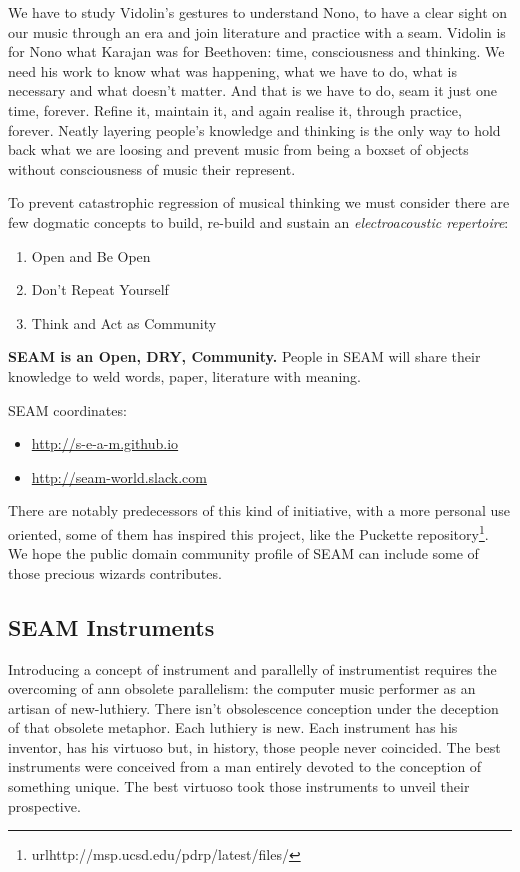 \documentclass[twoside,a4paper]{article}
\begin{document}
We have to study Vidolin's gestures to understand Nono, to have a clear sight on our music through an era and join literature and practice with a seam. Vidolin is for Nono what Karajan was for Beethoven: time, consciousness and thinking. We need his work to know what was happening, what we have to do, what is necessary and what doesn't matter. And that is we have to do, seam it just one time, forever. Refine it, maintain it, and again realise it, through practice, forever. Neatly layering people's knowledge and thinking is the only way to hold back what we are loosing and prevent music from being a boxset of objects without consciousness of music their represent. 

To prevent catastrophic regression of musical thinking we must consider there are few dogmatic concepts to build, re-build and sustain an \emph{electroacoustic repertoire}:
\begin{enumerate}
  \item Open and Be Open
  \item Don't Repeat Yourself
  \item Think and Act as Community
\end{enumerate}

\textbf{SEAM is an Open, DRY, Community.} People in SEAM will share their knowledge to weld words, paper, literature with meaning.

SEAM coordinates: 
\begin{itemize}
\item \url{http://s-e-a-m.github.io}
\item \url{http://seam-world.slack.com}
\end{itemize}

There are notably predecessors of this kind of initiative, with a more personal use oriented, some of them has inspired this project, like the Puckette\cite{mp01} repository\footnote{url{http://msp.ucsd.edu/pdrp/latest/files/}}. We hope the public domain community profile of SEAM can include some of those precious wizards contributes. 


\subsection{SEAM Instruments}

Introducing a concept of instrument and parallelly of instrumentist requires the overcoming of ann obsolete parallelism: the computer music performer as an artisan of new-luthiery. There isn't obsolescence conception under the deception of that obsolete metaphor. Each luthiery is new. Each instrument has his inventor,  has his virtuoso but, in history, those people never coincided. The best instruments were conceived from a man entirely devoted to the conception of something unique. The best virtuoso took those instruments to unveil their prospective.
\end{document}
